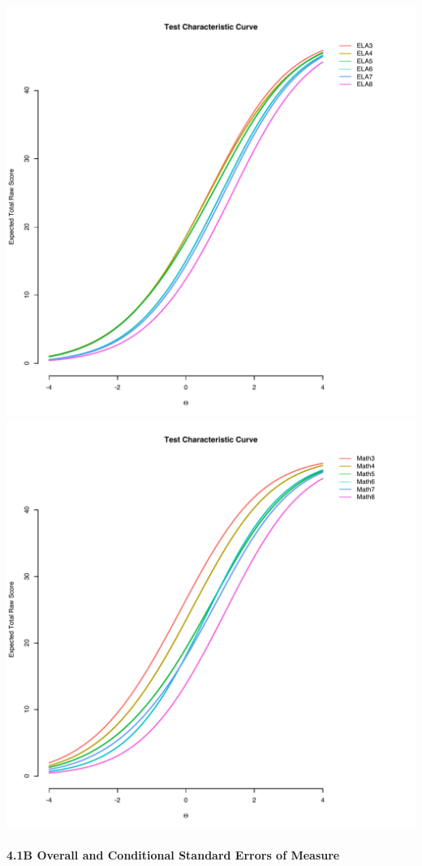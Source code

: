 \documentclass[]{article}
\let\oldparagraph\paragraph
\renewcommand{\paragraph}[1]{\oldparagraph{#1}\mbox{}}
\begin{document}
\includegraphics{tccs/ela_tccs.pdf} \includegraphics{tccs/math_tccs.pdf}
\clearpage

\paragraph{4.1B Overall and Conditional Standard Errors of
Measure}\label{b-overall-and-conditional-standard-errors-of-measure}
\end{document}
